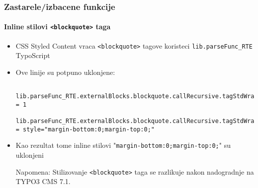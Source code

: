 
\begin{frame}[fragile]
	\frametitle{Zastarele/izbacene funkcije}
	\framesubtitle{Inline stilovi \texttt{<blockquote>} taga}

	\lstset{basicstyle=\tiny\ttfamily}

	\begin{itemize}

		\item CSS Styled Content vraca \texttt{<blockquote>} tagove koristeci \texttt{lib.parseFunc\_RTE} TypoScript
		\item Ove linije su potpuno uklonjene:

			\begin{lstlisting}
				lib.parseFunc_RTE.externalBlocks.blockquote.callRecursive.tagStdWrap.HTMLparser = 1
				lib.parseFunc_RTE.externalBlocks.blockquote.callRecursive.tagStdWrap.HTMLparser.tags.blockquote.overrideAttribs = style="margin-bottom:0;margin-top:0;"
			\end{lstlisting}

		\item Kao rezultat tome inline stilovi "\texttt{margin-bottom:0;margin-top:0;}"\newline
			su uklonjeni

			\vspace{0.2cm}

			\begingroup
				\color{red}
					Napomena: Stilizovanje \texttt{<blockquote>} taga se razlikuje nakon nadogradnje na TYPO3 CMS 7.1.
			\endgroup

	\end{itemize}

\end{frame}



